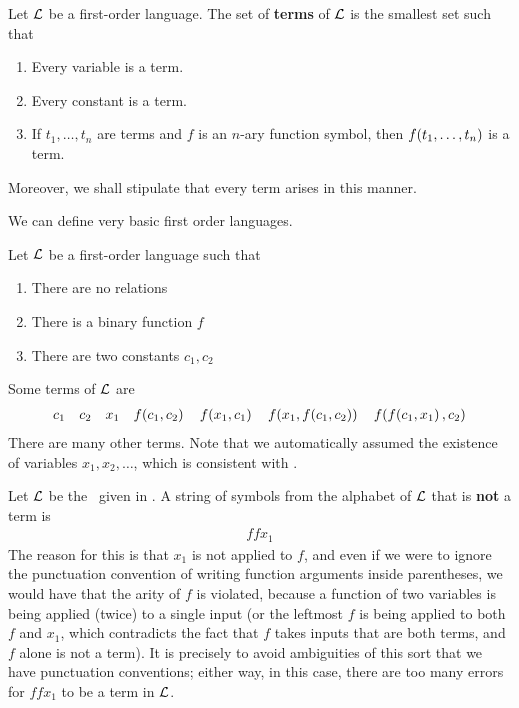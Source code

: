 \begin{boxdefinition}[Terms]\label{Ch2:Def:Terms_FO_Logic}
    Let $\mathcal{L}$ be a first-order language. The set of \textbf{terms} of $\mathcal{L}$ is the smallest set such that
    \begin{enumerate}
        \item Every variable is a term.
        \item Every constant is a term.
        \item If $t_1, \ldots, t_n$ are terms and $f$ is an $n$-ary function symbol, then $f\!\left( t_1, \ldots, t_n \right)$ is a term.
    \end{enumerate}
    Moreover, we shall stipulate that every term arises in this manner.
\end{boxdefinition}

We can define very basic first order languages.

\begin{boxexample}\label{Ch2:Eg:Terms_FO_Logic}
    Let $\mathcal{L}$ be a first-order language such that
    \begin{enumerate}
        \item There are no relations
        \item There is a binary function $f$
        \item There are two constants $c_1, c_2$
    \end{enumerate}
    Some terms of $\mathcal{L}$ are
    \begin{align*}
        c_1 \quad c_2 \quad x_1 \quad f\!\left( c_1, c_2 \right) \quad f\!\left( x_1, c_1 \right) \quad f\!\left( x_1, f\!\left( c_1, c_2 \right) \right) \quad f\!\left( f\!\left( c_1, x_1 \right), c_2 \right)
    \end{align*}
    There are many other terms. Note that we automatically assumed the existence of variables $x_1, x_2, \ldots$, which is consistent with . 
\end{boxexample}
\begin{boxnexample}
    Let $\mathcal{L}$ be the \fola\ given in . A string of symbols from the alphabet of $\mathcal{L}$ that is \textbf{not} a term is
    \begin{align*}
        f f x_1
    \end{align*}
    The reason for this is that $x_1$ is not applied to $f$, and even if we were to ignore the punctuation convention of writing function arguments inside parentheses, we would have that the arity of $f$ is violated, because a function of two variables is being applied (twice) to a single input (or the leftmost $f$ is being applied to both $f$ and $x_1$, which contradicts the fact that $f$ takes inputs that are both terms, and $f$ alone is not a term). It is precisely to avoid ambiguities of this sort that we have punctuation conventions; either way, in this case, there are too many errors for $f f x_1$ to be a term in $\mathcal{L}$.
\end{boxnexample}


